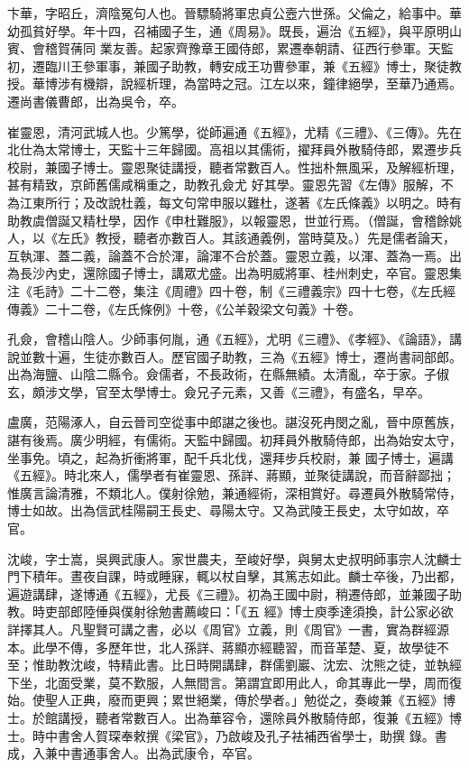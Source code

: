 \begin{pinyinscope}
 卞華，字昭丘，濟陰冤句人也。晉驃騎將軍忠貞公壼六世孫。父倫之，給事中。華幼孤貧好學。年十四，召補國子生，通《周易》。既長，遍治《五經》，與平原明山賓、會稽賀蒨同
 業友善。起家齊豫章王國侍郎，累遷奉朝請、征西行參軍。天監初，遷臨川王參軍事，兼國子助教，轉安成王功曹參軍，兼《五經》博士，聚徒教授。華博涉有機辯，說經析理，為當時之冠。江左以來，鐘律絕學，至華乃通焉。遷尚書儀曹郎，出為吳令，卒。



 崔靈恩，清河武城人也。少篤學，從師遍通《五經》，尤精《三禮》、《三傳》。先在北仕為太常博士，天監十三年歸國。高祖以其儒術，擢拜員外散騎侍郎，累遷步兵校尉，兼國子博士。靈恩聚徒講授，聽者常數百人。性拙朴無風采，及解經析理，甚有精致，京師舊儒咸稱重之，助教孔僉尤
 好其學。靈恩先習《左傳》服解，不為江東所行；及改說杜義，每文句常申服以難杜，遂著《左氏條義》以明之。時有助教虞僧誕又精杜學，因作《申杜難服》，以報靈恩，世並行焉。（僧誕，會稽餘姚人，以《左氏》教授，聽者亦數百人。其該通義例，當時莫及。）先是儒者論天，互執渾、蓋二義，論蓋不合於渾，論渾不合於蓋。靈恩立義，以渾、蓋為一焉。出為長沙內史，還除國子博士，講眾尤盛。出為明威將軍、桂州刺史，卒官。靈恩集注《毛詩》二十二卷，集注《周禮》四十卷，制《三禮義宗》四十七卷，《左氏經傳義》二十二卷，《左氏條例》十卷，《公羊穀梁文句義》十卷。



 孔僉，會稽山陰人。少師事何胤，通《五經》，尤明《三禮》、《孝經》、《論語》，講說並數十遍，生徒亦數百人。歷官國子助教，三為《五經》博士，遷尚書祠部郎。出為海鹽、山陰二縣令。僉儒者，不長政術，在縣無績。太清亂，卒于家。子俶玄，頗涉文學，官至太學博士。僉兄子元素，又善《三禮》，有盛名，早卒。



 盧廣，范陽涿人，自云晉司空從事中郎諶之後也。諶沒死冉閔之亂，晉中原舊族，諶有後焉。廣少明經，有儒術。天監中歸國。初拜員外散騎侍郎，出為始安太守，坐事免。頃之，起為折衝將軍，配千兵北伐，還拜步兵校尉，兼
 國子博士，遍講《五經》。時北來人，儒學者有崔靈恩、孫詳、蔣顯，並聚徒講說，而音辭鄙拙；惟廣言論清雅，不類北人。僕射徐勉，兼通經術，深相賞好。尋遷員外散騎常侍，博士如故。出為信武桂陽嗣王長史、尋陽太守。又為武陵王長史，太守如故，卒官。



 沈峻，字士嵩，吳興武康人。家世農夫，至峻好學，與舅太史叔明師事宗人沈麟士門下積年。晝夜自課，時或睡寐，輒以杖自擊，其篤志如此。麟士卒後，乃出都，遍遊講肆，遂博通《五經》，尤長《三禮》。初為王國中尉，稍遷侍郎，並兼國子助教。時吏部郎陸倕與僕射徐勉書薦峻曰：「《五
 經》博士庾季達須換，計公家必欲詳擇其人。凡聖賢可講之書，必以《周官》立義，則《周官》一書，實為群經源本。此學不傳，多歷年世，北人孫詳、蔣顯亦經聽習，而音革楚、夏，故學徒不至；惟助教沈峻，特精此書。比日時開講肆，群儒劉巖、沈宏、沈熊之徒，並執經下坐，北面受業，莫不歎服，人無間言。第謂宜即用此人，命其專此一學，周而復始。使聖人正典，廢而更興；累世絕業，傳於學者。」勉從之，奏峻兼《五經》博士。於館講授，聽者常數百人。出為華容令，還除員外散騎侍郎，復兼《五經》博士。時中書舍人賀琛奉敕撰《梁官》，乃啟峻及孔子袪補西省學士，助撰
 錄。書成，入兼中書通事舍人。出為武康令，卒官。




\end{pinyinscope}
